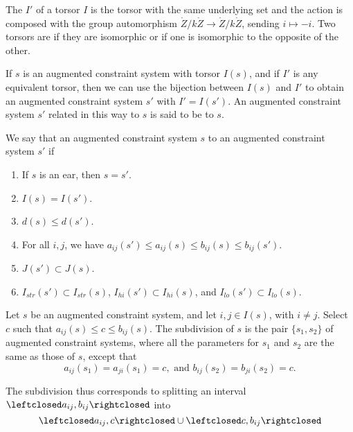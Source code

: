 \begin{definition} The  $I'$ of a torsor $I$ is the torsor with the
same underlying set and the action is composed with the group automorphism
$\ring{Z}/k\ring{Z}\to\ring{Z}/k\ring{Z}$, sending $i\mapsto -i$.
Two torsors are  if they are isomorphic or if 
one is isomorphic to the opposite of the other.
\end{definition}

If $s$ is an augmented constraint system with torsor $I(s)$, and if
$I'$ is any equivalent torsor, then we can use the bijection between $I(s)$ and $I'$
to obtain an augmented constraint system $s'$ with $I' = I(s')$.  An
augmented constraint system $s'$ related in this way to $s$ is said
to be  to $s$.

\begin{definition}  We say that an augmented constraint system $s$
 to an augmented constraint system $s'$ if
\begin{enumerate}
\item If $s$ is an ear, then $s=s'$.
\item $I(s) = I(s')$.
\item $d(s)\le d(s')$.
\item For all $i,j$, we have $a_{ij}(s')\le a_{ij}(s)\le b_{ij}(s)\le b_{ij}(s')$.
\item $J(s')\subset J(s)$.
\item $I_{str}(s')\subset I_{str}(s)$, $I_{hi}(s')\subset I_{hi}(s)$, and
$I_{lo}(s')\subset I_{lo}(s)$.
\end{enumerate}
\end{definition}

\begin{definition}[subdivision] Let $s$ be an augmented constraint system,
and let $i,j\in  I(s)$, with $i\ne j$.  Select $c$ such that $a_{ij}(s)\le c\le b_{ij}(s)$.
The subdivision of $s$ is the pair $\{s_1,s_2\}$ 
of augmented constraint systems, where all the parameters for $s_1$ and $s_2$
are the same as those of $s$, except that
\[
a_{ij}(s_1)=a_{ji}(s_1) = c, \text{ and } b_{ij}(s_2) = b_{ji}(s_2)=c.
\]
\end{definition}
The subdivision thus corresponds to splitting an interval 
$\leftclosed a_{ij},b_{ij}\rightclosed$ into
\[
\leftclosed a_{ij},c\rightclosed \cup \leftclosed c,b_{ij}\rightclosed
\]


